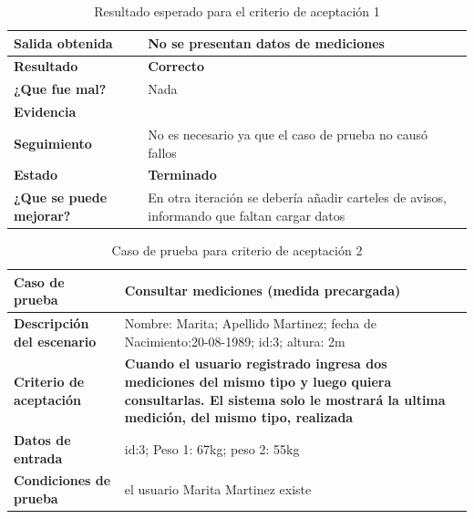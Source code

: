         {\scriptsize
	\begin{table}[h]
	\centering
	\begin{tabular}{|l|p{10cm}|}
	    \hline 
	    \textbf{Salida obtenida}& No se presentan datos de mediciones\\ \hline
	    \textbf{Resultado}& \textbf{Correcto}\\ \hline
        \textbf{¿Que fue mal?}& Nada\\ \hline      
        \textbf{Evidencia}& \\ \hline
        \textbf{Seguimiento}&No es necesario ya que el caso de prueba no causó
fallos \\ \hline
        \textbf{Estado}& \textbf{Terminado}\\ \hline        
         \textbf{¿Que se puede mejorar?}& En otra iteración se debería añadir carteles de avisos, informando que faltan cargar datos \\ \hline              
	    \end{tabular}
        \caption{Resultado esperado para el criterio de aceptación 1}
    	\end{table}
	}
\clearpage 

{\scriptsize
	\begin{table}[h]
	\centering
	\begin{tabular}{||l|p{9cm}||}
    	\rowcolor[gray]{0.9}
	    \hline 
        \hline 
	    \textbf{Caso de prueba}  &  \textbf{Consultar mediciones (medida precargada)}\\  \hline
	    \textbf{Descripción del escenario}& Nombre: Marita; Apellido Martinez; fecha de Nacimiento:20-08-1989; id:3; altura: 2m  \\ 			\hline
	    \textbf{Criterio de aceptación} &\textbf{ Cuando el usuario registrado ingresa dos mediciones del mismo tipo y luego quiera consultarlas. El sistema solo le mostrará la ultima medición, del mismo tipo, realizada} \\ \hline
        \textbf{Datos de entrada}& id:3; Peso 1: 67kg; peso 2: 55kg \\ \hline
        \textbf{Condiciones de  prueba}& el usuario Marita Martinez existe \\ \hline 			\hline
	    \end{tabular}
        \caption{Caso de prueba para criterio de aceptación 2}        
	    \end{table}
}
 
